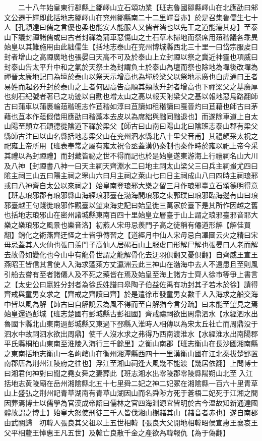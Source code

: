 　　二十八年始皇東行郡縣上鄒嶧山立石頌功業【班志魯國鄒縣嶧山在北應劭曰邾文公遷于繹即此括地志鄒嶧山在兖州鄒縣南二十二里嶧音亦】於是召集魯儒生七十人【孔穎達曰儒之言優也柔也能安人能服人又儒者濡也以先王之道能濡其身】至泰山下議封禪諸儒或曰古者封禪為蒲車惡傷山之土石草木掃地而祭席用葅稭議各乖異始皇以其難施用由此絀儒生【括地志泰山在兖州博城縣西北三十里一曰岱宗服䖍曰封者增山之高禪廣地也張晏曰天高不可及於泰山上立封禪以祭之冀近神靈也項威曰封泰山告太平升中和之氣於天祭土為封謂負土於泰山為壇而祭也除地為墠後改墠為禪晉太康地記曰為壇於泰山以祭天示增高也為墠於梁父以祭地示廣也白虎通曰王者易姓而起必升封於泰山之上者何因高告高順其類故升封者增高也下禪梁父之基廣厚也刻石紀號者著已之功迹以自勸也增太山之高以報天附梁父之基以報地惡烏路翻師古曰蒲車以蒲裹輪葅稭班志作苴稭如淳曰苴讀如租稭讀曰戛晉灼曰苴藉也師古曰茅藉也苴本作葅假借用應劭曰稭藁本去皮以為席絀與黜同黜退也】而遂除車道上自太山陽至顛立石頌德從隂道下禪於梁父【師古曰山南曰陽山北曰隂班志泰山郡有梁父縣師古注曰以山名縣括地志梁父山在兖州泗水縣北八十里父音甫】其禮頗采太祝之祀雍上帝所用【班表奉常之屬有雍太祝令丞蓋漢仍秦制也秦作畤於雍以祀上帝今采其禮以為封禪禮】而封藏皆祕之世不得而記也於是始皇遂東游海上行禮祠名山大川及八神【封禪書八神一曰天主祠天齊淵水二曰地主祠太山梁父三曰兵主祠蚩尤四曰隂主祠三山五曰陽主祠之罘山六曰月主祠之萊山七曰日主祠成山八曰四時主祠琅邪或曰八神齊自太公以來祠之】始皇南登琅邪大樂之留三月作琅邪臺立石頌德明得意【班志琅邪郡有琅邪縣山海經琅邪臺在渤海間琅邪之東郭璞曰琅邪臨海邊有山曰琅邪臺越王句踐徙琅邪作觀臺以望東海史記曰始皇徙三萬家於臺下是其所作因越之舊也括地志琅邪山在密州諸城縣東南百四十里始皇立層臺于山上謂之琅邪臺邪音耶大樂之樂琅邪之風景也樂音洛】初燕人宋毋忌羨門子高之徒稱有僊道形解【解佳買翻】銷化之術燕齊迂怪之士皆爭傳習之【道經月中仙人宋毋忌白凙圖云火之精曰宋毋忌蓋其人火仙也張曰羨門子高仙人居碣石山上服䖍曰形解尸解也張晏曰人老而解去故骨如變化也今山中有龍骨世謂之龍解骨化去迂羽俱翻又憂俱翻】自齊威王宣王燕昭王皆信其言使人入海求蓬萊方丈瀛洲云此三神山在渤海中去人不遠患且至則風引船去嘗有至者諸僊人及不死之藥皆在焉及始皇至海上諸方士齊人徐市等爭上書言之【太史公曰嬴姓分封者為徐氏姓譜曰皋陶子伯益佐禹有功封其子若木於徐】請得齊戒與童男女求之【齊戒之齊讀曰齊】於是遣徐市發童男女數千人入海求之船交海中皆以風為解【師古曰自解說云為風不得而至自解猶今言分疏】曰未能至望見之焉始皇還過彭城【班志楚國冇彭城縣古彭祖國】齊戒禱祠欲出周鼎泗水【水經泗水出魯國卞縣北山東南過彭城縣又東過下邳縣入淮時人相傳以為宋太丘社亡而周鼎没于泗水中故祠泗水欲出周鼎】使千人沒水求之弗得乃西南渡淮水【水經淮水出南陽郡平氏縣桐柏山東南至淮陵入海行三千餘里】之衡山南郡【班志衡山在長沙國湘南縣之東南括地志衡山一名岣嶁山在衡州湘潭縣西四十一里漢衡山國在江北秦拔楚郢置南郡唐為荆州江陵府之往也】浮江至湘山祠逢大風幾不能渡【幾居依翻】上問博士曰湘君何神對曰聞之堯女舜之妻葬此【班志湘水出零陵郡零陵縣陽朔山北至入江括地志黄陵廟在岳州湘隂縣北五十七里舜二妃之神二妃冢在湘隂縣一百六十里青草山上盛弘之荆州記青草湖南有青草山湖因山而名舜陟方死于蒼梧二妃死于江湘之間因葬焉博士以儒學為官漢成帝詔曰儒林之官四海淵源宜皆明於古今温故知新通達國體故謂之博士】始皇大怒使刑徒三千人皆伐湘山樹赭其山【赭音者赤也】遂自南郡由武關歸　初韓人張良其父祖以上五世相韓【張良大父開地相韓昭侯宣惠王襄哀王父平相釐王悼惠王凡五世】及韓亡良散千金之產欲為韓報仇【為于偽翻】

